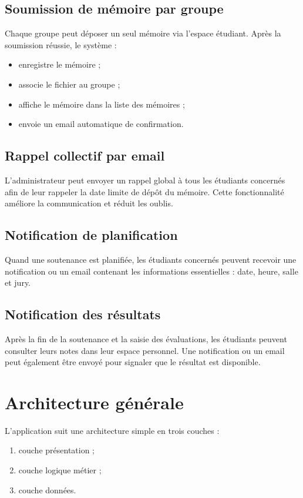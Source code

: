\documentclass[a4paper,12pt,oneside]{report}
\begin{document}
\subsection{Soumission de mémoire par groupe}

Chaque groupe peut déposer un seul mémoire via l'espace étudiant. Après la soumission réussie, le système :
\begin{itemize}
    \item enregistre le mémoire ;
    \item associe le fichier au groupe ;
    \item affiche le mémoire dans la liste des mémoires ;
    \item envoie un email automatique de confirmation.
\end{itemize}

\subsection{Rappel collectif par email}

L'administrateur peut envoyer un rappel global à tous les étudiants concernés afin de leur rappeler la date limite de dépôt du mémoire. Cette fonctionnalité améliore la communication et réduit les oublis.

\subsection{Notification de planification}

Quand une soutenance est planifiée, les étudiants concernés peuvent recevoir une notification ou un email contenant les informations essentielles : date, heure, salle et jury.

\subsection{Notification des résultats}

Après la fin de la soutenance et la saisie des évaluations, les étudiants peuvent consulter leurs notes dans leur espace personnel. Une notification ou un email peut également être envoyé pour signaler que le résultat est disponible.

\section{Architecture générale}

L'application suit une architecture simple en trois couches :
\begin{enumerate}
    \item couche présentation ;
    \item couche logique métier ;
    \item couche données.
\end{enumerate}
\end{document}
